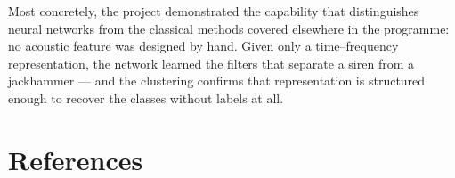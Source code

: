 \documentclass[11pt, a4paper]{article}
\begin{document}
Most concretely, the project demonstrated the capability that distinguishes neural networks from the classical methods covered elsewhere in the programme: no acoustic feature was designed by hand. Given only a time--frequency representation, the network learned the filters that separate a siren from a jackhammer --- and the clustering confirms that representation is structured enough to recover the classes without labels at all.

\section*{References}
\end{document}
